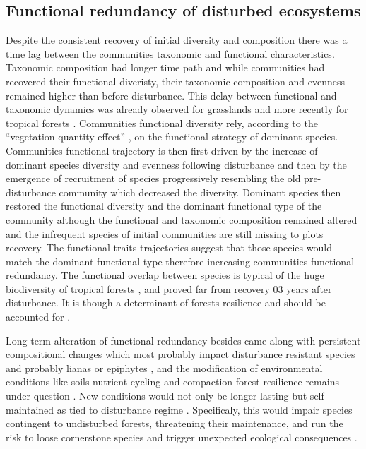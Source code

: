\documentclass[fleqn,10pt]{ArtEcoFoG} %
\theoremstyle{definition}
\theoremstyle{definition}
\theoremstyle{definition}
\theoremstyle{remark}
\begin{document}
\subsection{Functional redundancy of disturbed
ecosystems}\label{functional-redundancy-of-disturbed-ecosystems}

Despite the consistent recovery of initial diversity and composition
there was a time lag between the communities taxonomic and functional
characteristics. Taxonomic composition had longer time path and while
communities had recovered their functional diveristy, their taxonomic
composition and evenness remained higher than before disturbance. This
delay between functional and taxonomic dynamics was already observed for
grasslands \citep{Tilman1997, Mouillot2011} and more recently for
tropical forests \citep{Lohbeck2015, Guariguata2001}. Communities
functional diversity rely, according to the ``vegetation quantity
effect'' \citep{Grime1998}, on the functional strategy of dominant
species. Communities functional trajectory is then first driven by the
increase of dominant species diversity and evenness following
disturbance and then by the emergence of recruitment of species
progressively resembling the old pre-disturbance community which
decreased the diversity. Dominant species then restored the functional
diversity and the dominant functional type of the community although the
functional and taxonomic composition remained altered and the infrequent
species of initial communities are still missing to plots recovery. The
functional traits trajectories suggest that those species would match
the dominant functional type therefore increasing communities functional
redundancy. The functional overlap between species is typical of the
huge biodiversity of tropical forests \citep{Bellwood2006}, and proved
far from recovery 03 years after disturbance. It is though a determinant
of forests resilience and should be accounted for
\citep{Trenbath1999, Elmqvist2003, Diaz2005}.

Long-term alteration of functional redundancy besides came along with
persistent compositional changes which most probably impact disturbance
resistant species \citep{Haddad2008} and probably lianas or epiphytes
\citep{Martin2013}, and the modification of environmental conditions
like soils nutrient cycling and compaction \citep{Olander2005} forest
resilience remains under question \citep{Chazdon2003a}. New conditions
would not only be longer lasting but self-maintained as tied to
disturbance regime \citep{Burslem2000}. Specificaly, this would impair
species contingent to undisturbed forests, threatening their
maintenance, and run the risk to loose cornerstone species and trigger
unexpected ecological consequences
\citep{Jones1994, Diaz2005, Gardner2007}.
\end{document}
